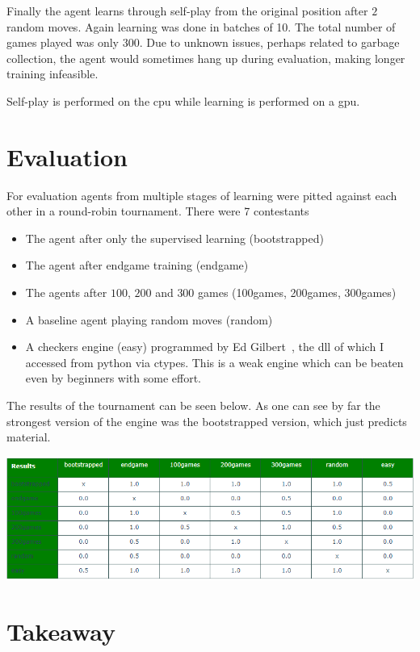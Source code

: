 \documentclass[a4paper,12pt]{article}
\theoremstyle{definition}
\theoremstyle{definition}
\theoremstyle{definition}
\theoremstyle{definition}
\theoremstyle{definition}
\theoremstyle{definition}
\begin{document}
	Finally the agent learns through self-play from the original position after $2$ random moves. Again learning was done in batches of 10. The total number of games played was only 300. Due to unknown issues, perhaps related to garbage collection, the agent would sometimes hang up during evaluation, making longer training infeasible.
	
	Self-play is performed on the cpu while learning is performed on a gpu.
	
	\section{Evaluation}
	
	For evaluation agents from multiple stages of learning were pitted against each other in a round-robin tournament. There were 7 contestants
	\begin{itemize}
		\item The agent after only the supervised learning (bootstrapped)
		\item The agent after endgame training (endgame)
		\item The agents after $100$, $200$ and $300$ games (100games, 200games, 300games)
		\item A baseline agent playing random moves (random)
		\item A checkers engine (easy) programmed by Ed Gilbert~\cite{CheckerBoard}, the dll of which I accessed from python via ctypes. This is a weak engine which can be beaten even by beginners with some effort.
	\end{itemize}

	The results of the tournament can be seen below. As one can see by far the strongest version of the engine was the bootstrapped version, which just predicts material.
	\begin{center}
		\includegraphics[width=\textwidth]{evaluation}
	\end{center}
	
	\section{Takeaway}
	
\end{document}
